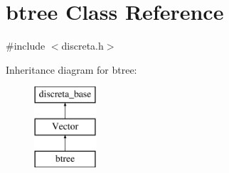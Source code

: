 \hypertarget{classbtree}{}\section{btree Class Reference}
\label{classbtree}


{\ttfamily \#include $<$discreta.\+h$>$}

Inheritance diagram for btree\+:\begin{figure}[H]
\begin{center}
\leavevmode
\includegraphics[height=3.000000cm]{classbtree}
\end{center}
\end{figure}
